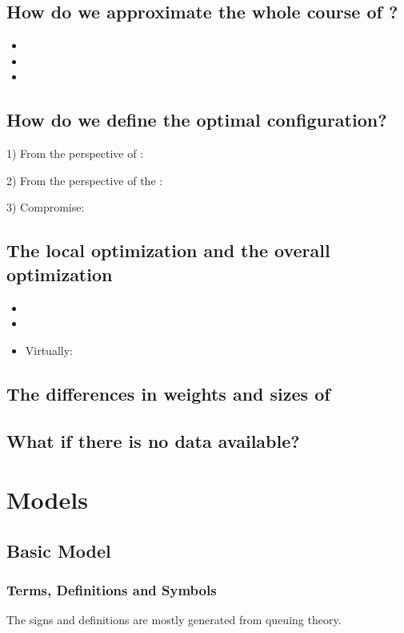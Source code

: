 \documentclass{apmcmthesis}
\begin{document}
\subsection{How do we approximate the whole course of ?}

\begin{itemize}
  \item
  \item
  \item
\end{itemize}


\subsection{How do we define the optimal configuration?}
1) From the perspective of      :\par
2) From the perspective of the      :\par
3) Compromise:

\subsection{The local optimization and the overall optimization}


\begin{itemize}
  \item
  \item
  \item Virtually:
\end{itemize}


\subsection{The differences in weights and sizes of}


\subsection{What if there is no data available?}






\section{Models}
\subsection{Basic Model}


\subsubsection{Terms, Definitions and Symbols}
The signs and definitions are mostly generated from queuing theory.
\end{document}

